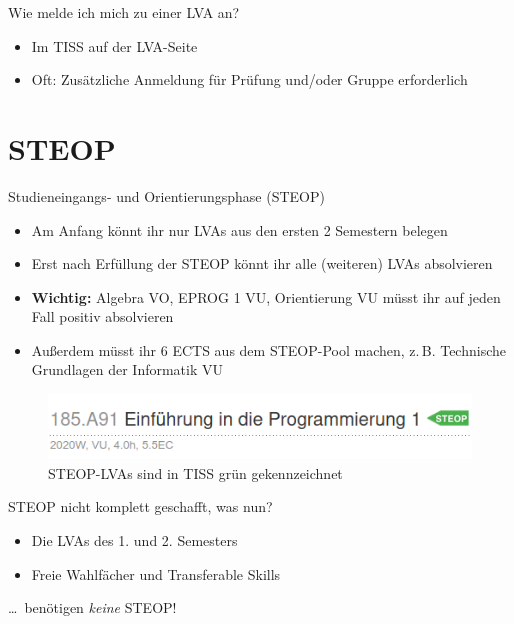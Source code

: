 \documentclass{beamer}
\begin{document}
\begin{frame}{Wie melde ich mich zu einer LVA an?}
    \begin{itemize}
        \item Im TISS auf der LVA-Seite
        \item Oft: Zusätzliche Anmeldung für Prüfung und/oder Gruppe erforderlich
    \end{itemize}
\end{frame}

\section{STEOP}

\begin{frame}{Studieneingangs- und Orientierungsphase (STEOP)}
    \begin{itemize}
        \item Am Anfang könnt ihr nur LVAs aus den ersten 2 Semestern belegen
        \item Erst nach Erfüllung der STEOP könnt ihr alle (weiteren) LVAs
              absolvieren
        \item \textbf{Wichtig:} Algebra VO, EPROG 1 VU, Orientierung VU
              müsst ihr auf jeden Fall positiv absolvieren
        \item Außerdem müsst ihr 6 ECTS aus dem STEOP-Pool machen,
              z.\,B. Technische Grundlagen der Informatik VU
    \end{itemize}
    \begin{figure}[htp]
        \centering
        \includegraphics[width=1\textwidth]{tiss_steop_marker.png}
        \caption{STEOP-LVAs sind in TISS grün gekennzeichnet}
    \end{figure}
\end{frame}

\begin{frame}{STEOP nicht komplett geschafft, was nun?}
    \begin{itemize}
        \item Die LVAs des 1. und 2. Semesters
        \item Freie Wahlfächer und Transferable Skills
    \end{itemize}
    \ldots\ benötigen \textit{keine} STEOP!\\
\end{frame}
\end{document}
